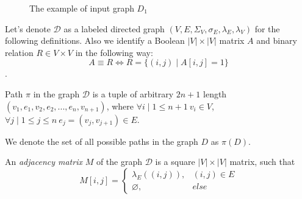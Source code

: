 \begin{figure}[h]
    \centering        
    \caption{The example of input graph $D_1$}
    \label{fig:example_input_graph}
\end{figure}


Let's denote $\mathcal{D}$ as a labeled directed graph $(V, E, \Sigma_V, \sigma_E, \lambda_E, \lambda_V)$ for the following definitions. Also we identify a Boolean $|V| \times |V|$ matrix $A$ and binary relation $R \in V \times V$ in the following way:
$$A \equiv R \iff R = \{(i, j) \mid A[i, j] = 1\}$$.

\begin{definition}
Path $\pi$ in the graph $\mathcal{D}$ is a tuple of arbitrary $2n +1$ length $(v_1, e_1, v_2, e_2, ..., e_n, v_{n+1})$, where $\forall i \mid 1 \leq n+1 ~ v_i \in V$, $\forall j \mid 1 \leq j \leq n ~ e_j=(v_j, v_{j+1}) \in E$.

We denote the set of all possible paths in the graph $D$ as $\pi(D)$. 
\end{definition}

\begin{definition}
An \emph{adjacency matrix} $M$ of the graph $\mathcal{D}$ is a square $|V|\times|V|$ matrix, such that 
\begin{equation*}
M[i,j] =
 \begin{cases}
   \lambda_E((i, j)), & (i, j) \in E\\
   \varnothing, & else
 \end{cases}
\end{equation*}
\end{definition}


